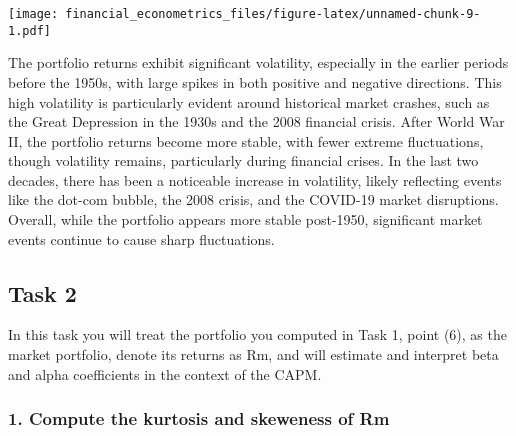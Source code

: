 \documentclass[
]{article}
\begin{document}
\texttt{[image: financial\_econometrics\_files/figure-latex/unnamed-chunk-9-1.pdf]}

The portfolio returns exhibit significant volatility, especially in the
earlier periods before the 1950s, with large spikes in both positive and
negative directions. This high volatility is particularly evident around
historical market crashes, such as the Great Depression in the 1930s and
the 2008 financial crisis. After World War II, the portfolio returns
become more stable, with fewer extreme fluctuations, though volatility
remains, particularly during financial crises. In the last two decades,
there has been a noticeable increase in volatility, likely reflecting
events like the dot-com bubble, the 2008 crisis, and the COVID-19 market
disruptions. Overall, while the portfolio appears more stable post-1950,
significant market events continue to cause sharp fluctuations.

\hypertarget{task-2}{%
\subsection{Task 2}\label{task-2}}

In this task you will treat the portfolio you computed in Task 1, point
(6), as the market portfolio, denote its returns as Rm, and will
estimate and interpret beta and alpha coefficients in the context of the
CAPM.

\hypertarget{compute-the-kurtosis-and-skeweness-of-rm}{%
\subsubsection{1. Compute the kurtosis and skeweness of
Rm}\label{compute-the-kurtosis-and-skeweness-of-rm}}
\end{document}
